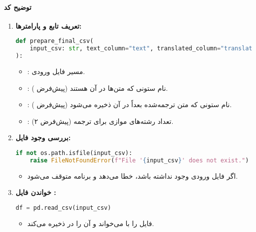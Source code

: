 \documentclass{article}
\begin{document}
\paragraph{توضیح کد }

\begin{enumerate}
    \item \textbf{تعریف تابع و پارامترها:}
    \begin{latin}
    \begin{lstlisting}[language=Python]
def prepare_final_csv(
    input_csv: str, text_column="text", translated_column="translated", workers=2
):
    \end{lstlisting}
    \end{latin}
    \begin{itemize}
        \item {}: مسیر فایل  ورودی.
        \item {}: نام ستونی که متن‌ها در آن هستند (پیش‌فرض ).
        \item {}: نام ستونی که متن ترجمه‌شده بعداً در آن ذخیره می‌شود (پیش‌فرض ).
        \item {}: تعداد رشته‌های موازی برای ترجمه (پیش‌فرض ۲).
    \end{itemize}

    \item \textbf{بررسی وجود فایل:}
    \begin{latin}
    \begin{lstlisting}[language=Python]
if not os.path.isfile(input_csv):
    raise FileNotFoundError(f"File '{input_csv}' does not exist.")
    \end{lstlisting}
    \end{latin}
    \begin{itemize}
        \item اگر فایل ورودی وجود نداشته باشد، خطا می‌دهد و برنامه متوقف می‌شود.
    \end{itemize}

    \item \textbf{خواندن فایل :}
    \begin{latin}
    \begin{lstlisting}[language=Python]
df = pd.read_csv(input_csv)
    \end{lstlisting}
    \end{latin}
    \begin{itemize}
        \item فایل  را با  می‌خواند و آن را در  ذخیره می‌کند.
    \end{itemize}


\end{enumerate}
\end{document}
